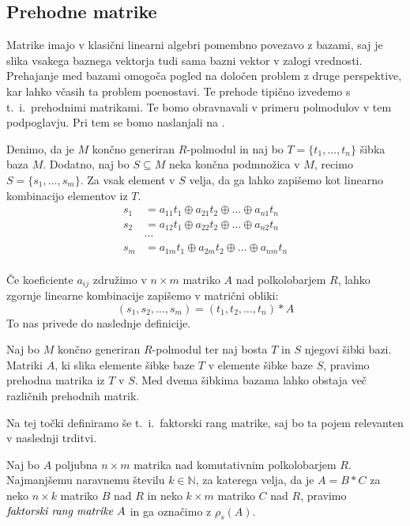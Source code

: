 \documentclass[mat1]{fmfdelo}
\newcommand{\N}{\mathbb{N}}
\newcommand{\pojem}[1]{\ensuremath{\emph{#1}}}
\begin{document}
\subsection{Prehodne matrike}\label{subsect:prehodmat}
Matrike imajo v klasični linearni algebri pomembno povezavo z bazami, saj je slika vsakega baznega vektorja tudi sama bazni vektor v zalogi vrednosti. Prehajanje med bazami omogoča pogled na določen problem z druge perspektive, kar lahko včasih ta problem poenostavi. Te prehode tipično izvedemo s t.~i.\ prehodnimi matrikami. Te bomo obravnavali v primeru polmodulov v tem podpoglavju. Pri tem se bomo naslanjali na \cite[poglavje 3]{bib:Tanbase}.

Denimo, da je $M$ končno generiran $R$-polmodul in naj bo $T = \{t_1, \ldots, t_n\}$ šibka baza $M$. Dodatno, naj bo $S\subseteq M$ neka končna podmnožica v $M$, recimo $S = \{s_1, \ldots, s_m\}$. Za vsak element v $S$ velja, da ga lahko zapišemo kot linearno kombinacijo elementov iz $T$. \begin{align*}
	s_1 &= a_{11}t_1 \oplus a_{21}t_2 \oplus \ldots \oplus a_{n1}t_n \\
	s_2 &= a_{12}t_1 \oplus a_{22}t_2 \oplus \ldots \oplus a_{n2}t_n \\
	&\cdots \\
	s_m &= a_{1m}t_1 \oplus a_{2m}t_2 \oplus \ldots \oplus a_{nm}t_n \\
\end{align*}

Če koeficiente $a_{ij}$ združimo v $n\times m$ matriko $A$ nad polkolobarjem $R$, lahko zgornje linearne kombinacije zapišemo v matrični obliki:$$
(s_1, s_2, \ldots, s_m ) = (t_1, t_2, \ldots, t_n) * A$$ 
To nas privede do naslednje definicije.

\begin{definicija}\label{def:prehodmat}
	Naj bo $M$ končno generiran $R$-polmodul ter naj bosta $T$ in $S$ njegovi šibki bazi. Matriki $A$, ki slika elemente šibke baze $T$ v elemente šibke baze $S$, pravimo prehodna matrika iz $T$ v $S$. Med dvema šibkima bazama lahko obstaja več različnih prehodnih matrik.
\end{definicija}

Na tej točki definiramo še t.~i.~faktorski rang matrike, saj bo ta pojem relevanten v naslednji trditvi.

\begin{definicija}\label{def:faktorrang}
	Naj bo $A$ poljubna $n\times m$ matrika nad komutativnim polkolobarjem $R$. Najmanjšemu naravnemu številu $k\in \N$, za katerega velja, da je $A= B*C$ za neko $n\times k$ matriko $B$ nad $R$ in neko $k\times m$ matriko $C$ nad $R$, pravimo \pojem{faktorski rang matrike $A$} in ga označimo z $\rho_s(A)$.
\end{definicija}
\end{document}
